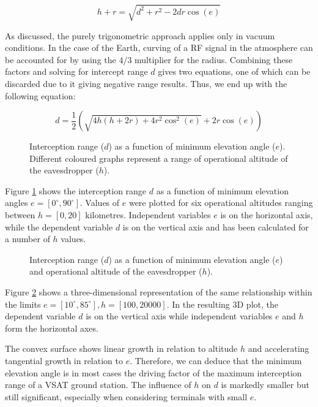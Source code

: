 \documentclass[english, 12pt, a4paper, elec, utf8, a-1b, online]{aaltothesis}
\begin{document}
\begin{equation} \label{eq-range-3}
  h + r = \sqrt{d^2 + r^2 - 2 d r \cos(e)}
\end{equation}

As discussed, the purely trigonometric approach applies only in vacuum conditions.
In the case of the Earth, curving of a RF signal in the atmosphere can be accounted for by using the $4/3$ multiplier for the radius.
Combining these factors and solving for intercept range $d$ gives two equations, one of which can be discarded due to it giving negative range results.
Thus, we end up with the following equation:

\begin{equation} \label{eq-range-4}
  d = \frac{1}{2} (\sqrt{4 h (h + 2 r) + 4 r^2 \cos^2(e)} + 2 r \cos(e))
\end{equation}

\begin{figure}[h]
  \centering
  
  \caption{Interception range ($d$) as a function of minimum elevation angle ($e$). Different coloured graphs represent a range of operational altitude of the eavesdropper ($h$).}
  \label{fig-interception-range-2d}
\end{figure}

Figure \ref{fig-interception-range-2d} shows the interception range $d$ as a function of minimum elevation angles $e = [0^\circ, 90^\circ]$.
Values of $e$ were plotted for six operational altitudes ranging between $h = [0,20]$ kilometres.
Independent variables $e$ is on the horizontal axis, while the dependent variable $d$ is on the vertical axis and has been calculated for a number of $h$ values.

\begin{figure}[h]
  \centering
  
  \caption{Interception range ($d$) as a function of minimum elevation angle ($e$) and operational altitude of the eavesdropper ($h$).}
  \label{fig-interception-range-3d}
\end{figure}

Figure \ref{fig-interception-range-3d} shows a three-dimensional representation of the same relationship within the limits $e = [10^\circ, 85^\circ], h = [100,20000]$.
In the resulting 3D plot, the dependent variable $d$ is on the vertical axis while independent variables $e$ and $h$ form the horizontal axes.

The convex surface shows linear growth in relation to altitude $h$ and accelerating tangential growth in relation to $e$.
Therefore, we can deduce that the minimum elevation angle is in most cases the driving factor of the maximum interception range of a VSAT ground station.
The influence of $h$ on $d$ is markedly smaller but still significant, especially when considering terminals with small $e$.
\end{document}
